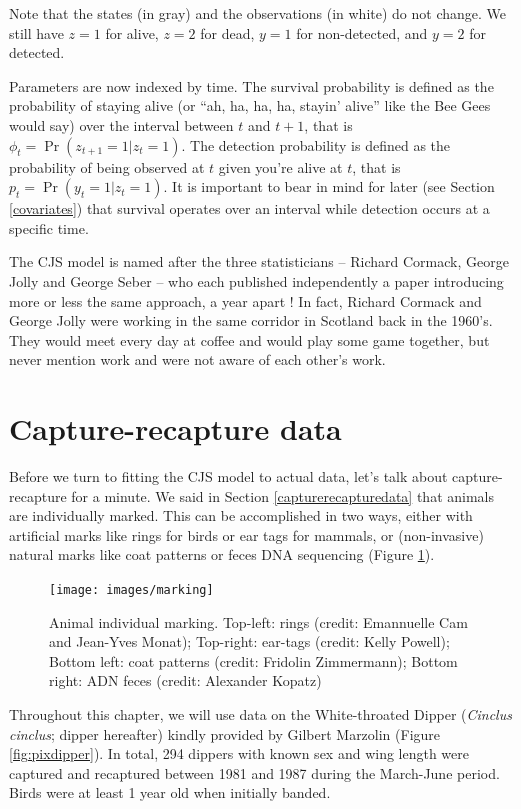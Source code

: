 \documentclass[
  12pt,
]{krantz}
\begin{document}
Note that the states (in gray) and the observations (in white) do not change. We still have \(z = 1\) for alive, \(z = 2\) for dead, \(y = 1\) for non-detected, and \(y = 2\) for detected.

Parameters are now indexed by time. The survival probability is defined as the probability of staying alive (or ``ah, ha, ha, ha, stayin' alive'' like the Bee Gees would say) over the interval between \(t\) and \(t+1\), that is \(\phi_t = \Pr(z_{t+1} = 1 | z_t = 1)\). The detection probability is defined as the probability of being observed at \(t\) given you're alive at \(t\), that is \(p_t = \Pr(y_{t} = 1 | z_t = 1)\). It is important to bear in mind for later (see Section \ref{covariates}) that survival operates over an interval while detection occurs at a specific time.

The CJS model is named after the three statisticians -- Richard Cormack, George Jolly and George Seber -- who each published independently a paper introducing more or less the same approach, a year apart ! In fact, Richard Cormack and George Jolly were working in the same corridor in Scotland back in the 1960's. They would meet every day at coffee and would play some game together, but never mention work and were not aware of each other's work.

\section{Capture-recapture data}\label{crdataeg}

Before we turn to fitting the CJS model to actual data, let's talk about capture-recapture for a minute. We said in Section \ref{capturerecapturedata} that animals are individually marked. This can be accomplished in two ways, either with artificial marks like rings for birds or ear tags for mammals, or (non-invasive) natural marks like coat patterns or feces DNA sequencing (Figure \ref{fig:marking}).

\begin{figure}
\texttt{[image: images/marking]} \caption{Animal individual marking. Top-left: rings (credit: Emannuelle Cam and Jean-Yves Monat); Top-right: ear-tags (credit: Kelly Powell); Bottom left: coat patterns (credit: Fridolin Zimmermann); Bottom right: ADN feces (credit: Alexander Kopatz)}\label{fig:marking}
\end{figure}

Throughout this chapter, we will use data on the White-throated Dipper (\emph{Cinclus cinclus}; dipper hereafter) kindly provided by Gilbert Marzolin (Figure \ref{fig:pixdipper}). In total, 294 dippers with known sex and wing length were captured and recaptured between 1981 and 1987 during the March-June period. Birds were at least 1 year old when initially banded.
\end{document}
